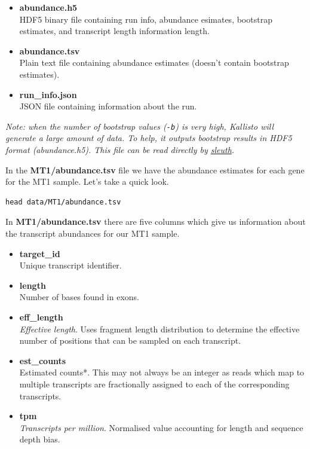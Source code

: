 \documentclass[11pt]{article}
\makeatletter
\newcommand{\boxspacing}{\kern\kvtcb@left@rule\kern\kvtcb@boxsep}
\newcommand{\prompt}[4]{
        \ttfamily\llap{{\color{#2}[#3]:\hspace{3pt}#4}}\vspace{-\baselineskip}
    }
\makeatother
\begin{document}
\begin{itemize}
\item
  \textbf{abundance.h5}\\
  HDF5 binary file containing run info, abundance esimates, bootstrap
  estimates, and transcript length information length.
\item
  \textbf{abundance.tsv}\\
  Plain text file containing abundance estimates (doesn't contain
  bootstrap estimates).
\item
  \textbf{run\_info.json}\\
  JSON file containing information about the run.
\end{itemize}

\textit{Note: when the number of bootstrap values (\texttt{-b}) is very
high, Kallisto will generate a large amount of data. To help, it outputs
bootstrap results in HDF5 format (abundance.h5). This file can be read
directly by \href{https://pachterlab.github.io/sleuth}{sleuth}.}

In the \textbf{MT1/abundance.tsv} file we have the abundance estimates
for each gene for the MT1 sample. Let's take a quick look.

    \begin{tcolorbox}[breakable, size=fbox, boxrule=1pt, pad at break*=1mm,colback=cellbackground, colframe=cellborder]
\prompt{In}{incolor}{ }{\boxspacing}
\begin{Verbatim}[commandchars=\\\{\}]
head data/MT1/abundance.tsv
\end{Verbatim}
\end{tcolorbox}

    In \textbf{MT1/abundance.tsv} there are five columns which give us
information about the transcript abundances for our MT1 sample.

\begin{itemize}
\item
  \textbf{target\_id}\\
  Unique transcript identifier.
\item
  \textbf{length}\\
  Number of bases found in exons.
\item
  \textbf{eff\_length}\\
  \textit{Effective length}. Uses fragment length distribution to
  determine the effective number of positions that can be sampled on
  each transcript.
\item
  \textbf{est\_counts}\\
  Estimated counts*. This may not always be an integer as reads which
  map to multiple transcripts are fractionally assigned to each of the
  corresponding transcripts.
\item
  \textbf{tpm}\\
  \textit{Transcripts per million}. Normalised value accounting for length
  and sequence depth bias.
\end{itemize}
\end{document}
